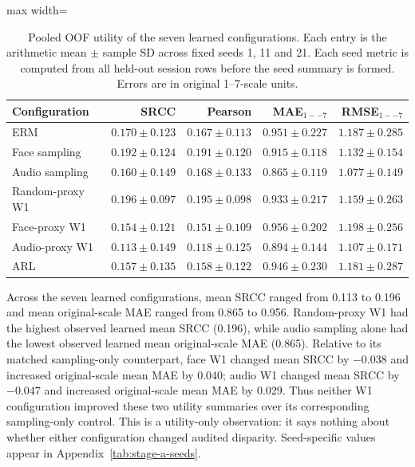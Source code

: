\begin{table}[htbp]
\centering
\caption{Pooled OOF utility of the seven learned configurations. Each entry is the arithmetic mean
$\pm$ sample SD across fixed seeds 1, 11 and 21. Each seed metric is computed from all held-out
session rows before the seed summary is formed. Errors are in original 1--7-scale units.}
\label{tab:stage-a-learned}
\small
\begin{adjustbox}{max width=\textwidth}
\begin{tabular}{lrrrr}
\toprule
Configuration & SRCC & Pearson & MAE$_{1--7}$ & RMSE$_{1--7}$ \\
\midrule
ERM & $0.170\pm0.123$ & $0.167\pm0.113$ & $0.951\pm0.227$ & $1.187\pm0.285$ \\
Face sampling & $0.192\pm0.124$ & $0.191\pm0.120$ & $0.915\pm0.118$ & $1.132\pm0.154$ \\
Audio sampling & $0.160\pm0.149$ & $0.168\pm0.133$ & $0.865\pm0.119$ & $1.077\pm0.149$ \\
Random-proxy W1 & $0.196\pm0.097$ & $0.195\pm0.098$ & $0.933\pm0.217$ & $1.159\pm0.263$ \\
Face-proxy W1 & $0.154\pm0.121$ & $0.151\pm0.109$ & $0.956\pm0.202$ & $1.198\pm0.256$ \\
Audio-proxy W1 & $0.113\pm0.149$ & $0.118\pm0.125$ & $0.894\pm0.144$ & $1.107\pm0.171$ \\
ARL & $0.157\pm0.135$ & $0.158\pm0.122$ & $0.946\pm0.230$ & $1.181\pm0.287$ \\
\bottomrule
\end{tabular}
\end{adjustbox}
\end{table}
\FloatBarrier

Across the seven learned configurations, mean SRCC ranged from 0.113 to 0.196 and mean
original-scale MAE ranged from 0.865 to 0.956. Random-proxy W1 had the highest observed
learned mean SRCC (0.196), while audio sampling alone had the lowest observed learned mean
original-scale MAE (0.865). Relative to its matched sampling-only counterpart, face W1 changed
mean SRCC by $-0.038$ and increased original-scale mean MAE by 0.040; audio W1 changed mean
SRCC by $-0.047$ and increased original-scale mean MAE by 0.029. Thus neither W1
configuration improved these two utility summaries over its corresponding sampling-only control.
This is a utility-only observation: it says nothing about whether either configuration changed
audited disparity. Seed-specific values appear in Appendix~\ref{tab:stage-a-seeds}.

